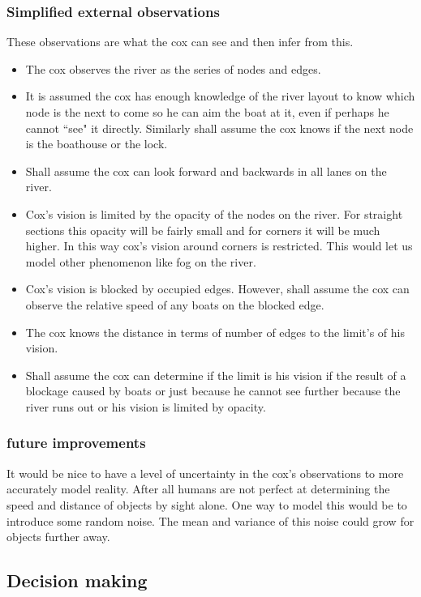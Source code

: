       \subsubsection{Simplified external observations}
      These observations are what the cox can see and then infer from this.
      \begin{itemize}
        \item The cox observes the river as the series of nodes and edges.
        \item It is assumed the cox has enough knowledge of the river layout to know which node is the next to come so he can aim the boat at it, even if perhaps he cannot ``see" it directly. Similarly shall assume the cox knows if the next node is the boathouse or the lock.
        \item Shall assume the cox can look forward and backwards in all lanes on the river.
        \item Cox's vision is limited by the opacity of the nodes on the river. For straight sections this opacity will be fairly small and for corners it will be much higher. In this way cox's vision around corners is restricted. This would let us model other phenomenon like fog on the river.
        \item Cox's vision is blocked by occupied edges. However, shall assume the cox can observe the relative speed of any boats on the blocked edge.
        \item The cox knows the distance in terms of number of edges to the limit's of his vision.
        \item Shall assume the cox can determine if the limit is his vision if the result of a blockage caused by boats or just because he cannot see further because the river runs out or his vision is limited by opacity.
      \end{itemize}
      
      \subsubsection{future improvements}
      It would be nice to have a level of uncertainty in the cox's observations to more accurately model reality. After all humans are not perfect at determining the speed and distance of objects by sight alone. One way to model this would be to introduce some random noise. The mean and variance of this noise could grow for objects further away.
      
      \subsection{Decision making}
